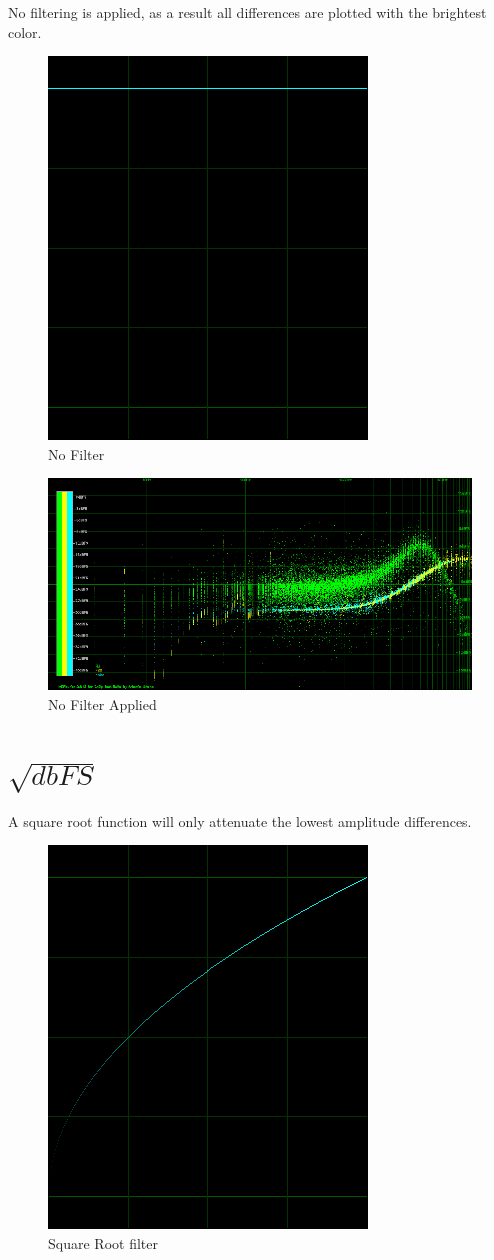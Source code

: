 \documentclass[10pt,a4paper]{report}
\begin{document}
\begin{appendices}
No filtering is applied, as a result all differences are plotted with the brightest color. 

\begin{figure}[H]
	\centering
	\includegraphics[width=0.4\linewidth]{images/colorfilter/BetaFunctionPlot_0.png}
	\caption[No Filter]{No Filter}
	\label{fig:betafunctionplot0}
\end{figure}

\begin{figure}[H]
	\centering
	\includegraphics[width=1\linewidth]{images/colorfilter/BetaFunctionPlot_0_Data.png}
	\caption[No Filter]{No Filter Applied}
	\label{fig:betafunctionplot0data}
\end{figure}

\newpage
\section{$\sqrt{dbFS}$} 

A square root function will only attenuate the lowest amplitude differences.

\begin{figure}[H]
	\centering
	\includegraphics[width=0.4\linewidth]{images/colorfilter/BetaFunctionPlot_1.png}
	\caption[Square Root filter]{Square Root filter}
	\label{fig:betafunctionplot1}
\end{figure}


\end{appendices}
\end{document}
